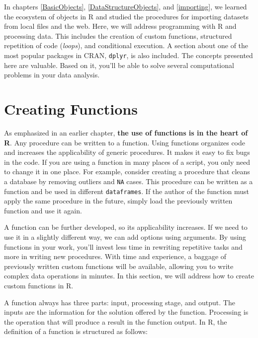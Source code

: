 \documentclass[11pt,]{book}
\begin{document}
In chapters \ref{BasicObjects}, \ref{DataStructureObjects}, and
\ref{importing}, we learned the ecosystem of objects in R and studied
the procedures for importing datasets from local files and the web.
Here, we will address programming with R and processing data. This
includes the creation of custom functions, structured repetition of code
(\emph{loops}), and conditional execution. A section about one of the
most popular packages in CRAN, \texttt{dplyr}, is also included. The
concepts presented here are valuable. Based on it, you'll be able to
solve several computational problems in your data analysis.

\section{Creating Functions}\label{creating-functions}

As emphasized in an earlier chapter, \textbf{the use of functions is in
the heart of R}. Any procedure can be written to a function. Using
functions organizes code and increases the applicability of generic
procedures. It makes it easy to fix bugs in the code. If you are using a
function in many places of a script, you only need to change it in one
place. For example, consider creating a procedure that cleans a database
by removing outliers and \texttt{NA} cases. This procedure can be
written as a function and be used in different \texttt{dataframes}. If
the author of the function must apply the same procedure in the future,
simply load the previously written function and use it again.

A function can be further developed, so its applicability increases. If
we need to use it in a slightly different way, we can add options using
arguments. By using functions in your work, you'll invest less time in
rewriting repetitive tasks and more in writing new procedures. With time
and experience, a baggage of previously written custom functions will be
available, allowing you to write complex data operations in minutes. In
this section, we will address how to create custom functions in R.

A function always has three parts: input, processing stage, and output.
The inputs are the information for the solution offered by the function.
Processing is the operation that will produce a result in the function
output. In R, the definition of a function is structured as follows:
\end{document}
